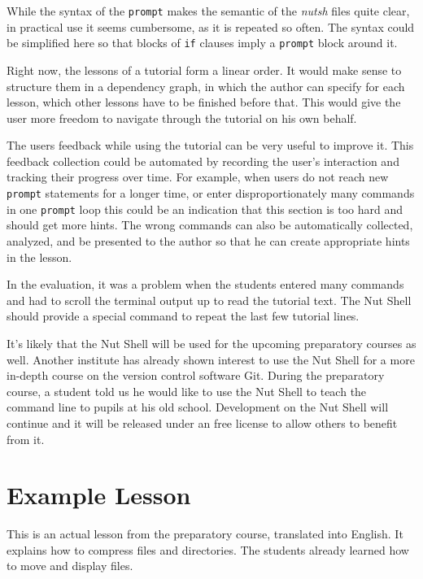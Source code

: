 \documentclass[paper=a4,twoside,abstract=on,cleardoublepage=empty,numbers=noenddot,toc=bib,12pt,appendixprefix=true]{scrreprt}
\begin{document}
While the syntax of the \texttt{prompt} makes the semantic of the \emph{nutsh} files quite clear, in practical use it seems cumbersome, as it is repeated so often. The syntax could be simplified here so that blocks of \texttt{if} clauses imply a \texttt{prompt} block around it.

Right now, the lessons of a tutorial form a linear order. It would make sense to structure them in a dependency graph, in which the author can specify for each lesson, which other lessons have to be finished before that. This would give the user more freedom to navigate through the tutorial on his own behalf.


The users feedback while using the tutorial can be very useful to improve it. This feedback collection could be automated by recording the user's interaction and tracking their progress over time. For example, when users do not reach new \texttt{prompt} statements for a longer time, or enter disproportionately many commands in one \texttt{prompt} loop this could be an indication that this section is too hard and should get more hints. The wrong commands can also be automatically collected, analyzed, and be presented to the author so that he can create appropriate hints in the lesson.

In the evaluation, it was a problem when the students entered many commands and had to scroll the terminal output up to read the tutorial text. The Nut Shell should provide a special command to repeat the last few tutorial lines.

It's likely that the Nut Shell will be used for the upcoming preparatory courses as well. Another institute has already shown interest to use the Nut Shell for a more in-depth course on the version control software Git. During the preparatory course, a student told us he would like to use the Nut Shell to teach the command line to pupils at his old school. Development on the Nut Shell will continue and it will be released under an free license to allow others to benefit from it.

\cleardoublepage
\appendix

\chapter{Example Lesson}
\label{sec:nutshexample}

This is an actual lesson from the preparatory course, translated into English. It explains how to compress files and directories. The students already learned how to move and display files.
\end{document}
